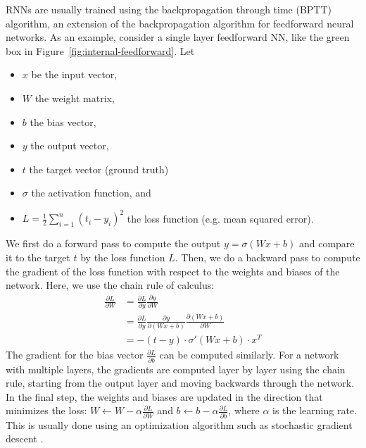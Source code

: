 \documentclass{article}
\newcommand{\reffig}[1]{Figure~\ref{#1}}
\begin{document}
RNNs are usually trained using the backpropagation through time (BPTT) algorithm, an
extension of the backpropagation algorithm for feedforward neural networks. As an example,
consider a single layer feedforward NN, like the green box in
\reffig{fig:internal-feedforward}. Let
\begin{itemize}
  \item $x$ be the input vector,
  \item $W$ the weight matrix,
  \item $b$ the bias vector,
  \item $y$ the output vector,
  \item $t$ the target vector (ground truth)
  \item $\sigma$ the activation function, and
  \item $L = \frac{1}{2} \sum_{i=1}^{n} (t_i - y_i)^2$ the loss function (e.g. mean
        squared error).
\end{itemize}
We first do a forward pass to compute the output $y = \sigma(Wx + b)$ and compare it to
the target $t$ by the loss function $L$. Then, we do a backward pass to compute the
gradient of the loss function with respect to the weights and biases of the network. Here,
we use the chain rule of calculus:
\begin{align}
  \frac{\partial L}{\partial W} & = \frac{\partial L}{\partial y} \frac{\partial y}{\partial W}                                             \\
                                & = \frac{\partial L}{\partial y} \frac{\partial y}{\partial (Wx + b)} \frac{\partial (Wx + b)}{\partial W} \\
                                & = -(t-y) \cdot \sigma'(Wx + b) \cdot x^T
\end{align}
The gradient for the bias vector $\frac{\partial L}{\partial b}$ can be computed
similarly. For a network with multiple layers, the gradients are computed layer by layer
using the chain rule, starting from the output layer and moving backwards through the
network. In the final step, the weights and biases are updated in the direction that
minimizes the loss: $W \leftarrow W - \alpha \frac{\partial L}{\partial W}$ and $b
  \leftarrow b - \alpha \frac{\partial L}{\partial b}$, where $\alpha$ is the learning rate.
This is usually done using an optimization algorithm such as stochastic gradient descent
\cite{Goodfellow2016}.
\end{document}
